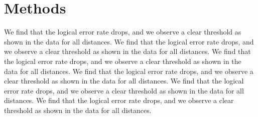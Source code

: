 \documentclass{article}
\begin{document}
\section{Methods}
We find that the logical error rate drops, and we observe a clear threshold as shown in the data for all distances. We find that the logical error rate drops, and we observe a clear threshold as shown in the data for all distances. We find that the logical error rate drops, and we observe a clear threshold as shown in the data for all distances. We find that the logical error rate drops, and we observe a clear threshold as shown in the data for all distances. We find that the logical error rate drops, and we observe a clear threshold as shown in the data for all distances. We find that the logical error rate drops, and we observe a clear threshold as shown in the data for all distances.
\end{document}
